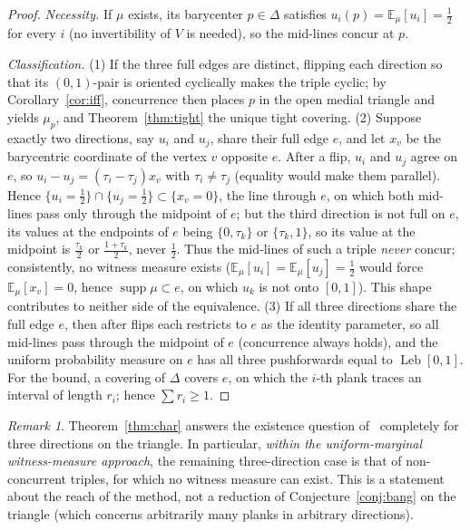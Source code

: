 \documentclass[11pt,reqno]{amsart}
\theoremstyle{plain}
\theoremstyle{definition}
\theoremstyle{remark}
\newtheorem{remark}[theorem]{Remark}
\newcommand{\Leb}{\operatorname{Leb}}
\begin{document}
\begin{proof}
\emph{Necessity.} If $\mu$ exists, its barycenter $p\in\Delta$ satisfies
$u_i(p)=\mathbb E_\mu[u_i]=\tfrac12$ for every $i$ (no invertibility of $V$ is
needed), so the mid-lines concur at $p$.

\emph{Classification.} (1) If the three full edges are distinct, flipping each
direction so that its $(0,1)$-pair is oriented cyclically makes the triple
cyclic; by Corollary~\ref{cor:iff}, concurrence then places $p$ in the open
medial triangle and yields $\mu_p$, and Theorem~\ref{thm:tight} the unique
tight covering. (2) Suppose exactly two directions, say $u_i$ and $u_j$, share
their full edge $e$, and let $x_v$ be the barycentric coordinate of the vertex
$v$ opposite $e$. After a flip, $u_i$ and $u_j$ agree on $e$, so
$u_i-u_j=(\tau_i-\tau_j)x_v$ with $\tau_i\ne\tau_j$ (equality would make them
parallel). Hence $\{u_i=\tfrac12\}\cap\{u_j=\tfrac12\}\subset\{x_v=0\}$, the
line through $e$, on which both mid-lines pass only through the midpoint of
$e$; but the third direction is not full on $e$, its values at the endpoints of
$e$ being $\{0,\tau_k\}$ or $\{\tau_k,1\}$, so its value at the midpoint is
$\tfrac{\tau_k}2$ or $\tfrac{1+\tau_k}2$, never $\tfrac12$. Thus the mid-lines
of such a triple \emph{never} concur; consistently, no witness measure exists
($\mathbb E_\mu[u_i]=\mathbb E_\mu[u_j]=\tfrac12$ would force
$\mathbb E_\mu[x_v]=0$, hence $\operatorname{supp}\mu\subset e$, on which $u_k$
is not onto $[0,1]$). This shape contributes to neither side of the
equivalence. (3) If all three directions share the full edge $e$, then after
flips each restricts to $e$ as the identity parameter, so all mid-lines pass
through the midpoint of $e$ (concurrence always holds), and the uniform
probability measure on $e$ has all three pushforwards equal to $\Leb[0,1]$.
For the bound, a covering of $\Delta$ covers $e$, on which the $i$-th plank
traces an interval of length $r_i$; hence $\sum r_i\ge1$.
\end{proof}

\begin{remark}\label{rem:charscope}
Theorem~\ref{thm:char} answers the existence question of~\cite{Gardner88}
completely for three directions on the triangle. In particular, \emph{within the
uniform-marginal witness-measure approach}, the remaining three-direction case
is that of non-concurrent triples, for which no witness measure can exist. This
is a statement about the reach of the method, not a reduction of
Conjecture~\ref{conj:bang} on the triangle (which concerns arbitrarily many
planks in arbitrary directions).
\end{remark}
\end{document}
